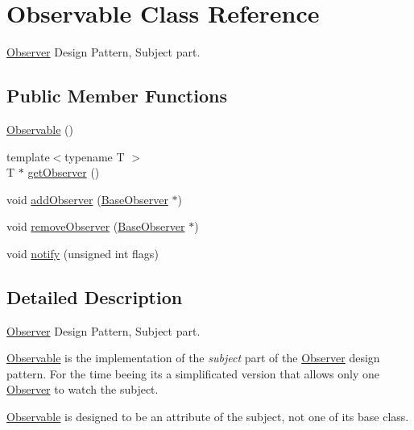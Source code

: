 \hypertarget{classKatabatic_1_1Observable}{}\section{Observable Class Reference}
\label{classKatabatic_1_1Observable}


\mbox{\hyperlink{classKatabatic_1_1Observer}{Observer}} Design Pattern, Subject part.  


\subsection*{Public Member Functions}
\begin{DoxyCompactItemize}
\item 
\mbox{\hyperlink{classKatabatic_1_1Observable_a6438e92e07db169a97ed3eba36788dc4}{Observable}} ()
\item 
{\footnotesize template$<$typename T $>$ }\\T $\ast$ \mbox{\hyperlink{classKatabatic_1_1Observable_acc0b7276e09628f2b101ecf751aacd2a}{get\+Observer}} ()
\item 
void \mbox{\hyperlink{classKatabatic_1_1Observable_a783fda85eeabe9c660881f236f162767}{add\+Observer}} (\mbox{\hyperlink{classKatabatic_1_1BaseObserver}{Base\+Observer}} $\ast$)
\item 
void \mbox{\hyperlink{classKatabatic_1_1Observable_acaa5a7fc7fa631e3006a42006d753f43}{remove\+Observer}} (\mbox{\hyperlink{classKatabatic_1_1BaseObserver}{Base\+Observer}} $\ast$)
\item 
void \mbox{\hyperlink{classKatabatic_1_1Observable_a52e577fb0c4f2e3650928334fb621c2f}{notify}} (unsigned int flags)
\end{DoxyCompactItemize}


\subsection{Detailed Description}
\mbox{\hyperlink{classKatabatic_1_1Observer}{Observer}} Design Pattern, Subject part. 

\mbox{\hyperlink{classKatabatic_1_1Observable}{Observable}} is the implementation of the {\itshape subject} part of the \mbox{\hyperlink{classKatabatic_1_1Observer}{Observer}} design pattern. For the time beeing it\textquotesingle{}s a simplificated version that allows only one \mbox{\hyperlink{classKatabatic_1_1Observer}{Observer}} to watch the subject.

\mbox{\hyperlink{classKatabatic_1_1Observable}{Observable}} is designed to be an attribute of the subject, not one of it\textquotesingle{}s base class.

